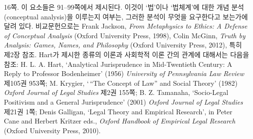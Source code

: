 {\noteentry 16쪽.  이
요소들은 91--99쪽에서 제시된다. 이것이 ‘법’이나 ‘법체계’에 대한 개념
분석(conceptual analysis)을 이루는지 여부는, 그러한 분석이 무엇을
요구한다고 보는가에 달려 있다. 비교문헌으로는 Frank Jackson, \emph{From
Metaphysics to Ethics: A Defense of Conceptual Analysis} (Oxford
University Press, 1998), Colin McGinn, \emph{Truth by Analysis: Games,
Names, and Philosophy} (Oxford University Press, 2012), 특히 제2장 참조.
Hart가 제시한 종류의 이론과 사회학적 이론 간의 관계에 대해서는 다음을
참조: H. L. A. Hart, `Analytical Jurisprudence in Mid-Twentieth Century:
A Reply to Professor Bodenheimer' (1956) \emph{University of
Pennsylvania Law Review} 제105권 953쪽; M. Krygier, `\,“The Concept of
Law” and Social Theory' (1982) \emph{Oxford Journal of Legal Studies}
제2권 155쪽; B. Z. Tamanaha, `Socio-Legal Positivism and a General
Jurisprudence' (2001) \emph{Oxford Journal of Legal Studies} 제21권 1쪽;
Denis Galligan, `Legal Theory and Empirical Research', in Peter Cane and
Herbert Kritzer eds., \emph{Oxford Handbook of Empirical Legal Research}
(Oxford University Press, 2010).
}

